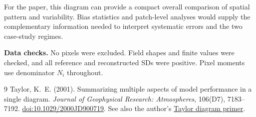 \documentclass[11pt,a4paper]{article}
\begin{document}
For the paper, this diagram can provide a compact overall comparison of spatial pattern and variability. Bias statistics and patch-level analyses would supply the complementary information needed to interpret systematic errors and the two case-study regimes.

\textbf{Data checks.} No pixels were excluded. Field shapes and finite values were checked, and all reference and reconstructed SDs were positive. Pixel moments use denominator $N_i$ throughout.

\begin{thebibliography}{9}
\small
{}
Taylor, K.~E. (2001).
Summarizing multiple aspects of model performance in a single diagram.
\emph{Journal of Geophysical Research: Atmospheres}, 106(D7), 7183--7192.
\href{https://doi.org/10.1029/2000JD900719}{doi:10.1029/2000JD900719}.
See also the author's
\href{https://pcmdi.llnl.gov/staff/taylor/CV/Taylor_diagram_primer.pdf}{Taylor diagram primer}.
\end{thebibliography}
\end{document}
